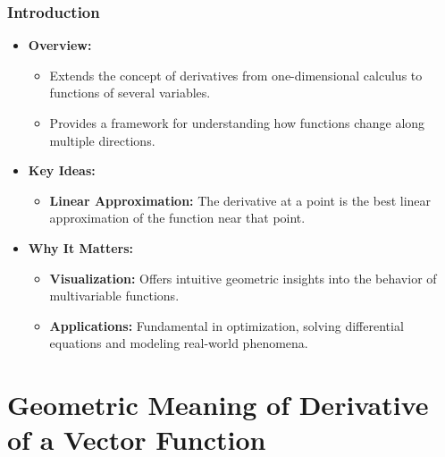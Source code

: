 \documentclass{beamer}
\begin{document}
\begin{frame}
\frametitle{Introduction}
\begin{itemize}
    \item \textbf{Overview:}
      \begin{itemize}
        \item Extends the concept of derivatives from one-dimensional calculus to functions of several variables.
        \item Provides a framework for understanding how functions change along multiple directions.
      \end{itemize}
    \item \textbf{Key Ideas:}
      \begin{itemize}
        \item \textbf{Linear Approximation:} The derivative at a point is the best linear approximation of the function near that point.
      \end{itemize}
    \item \textbf{Why It Matters:}
      \begin{itemize}
        \item \textbf{Visualization:} Offers intuitive geometric insights into the behavior of multivariable functions.
        \item \textbf{Applications:} Fundamental in optimization, solving differential equations and modeling real-world phenomena.
      \end{itemize}
  \end{itemize}

\end{frame}
\section{Geometric Meaning of Derivative of a Vector Function } %
\subsection{} %
\end{document}
